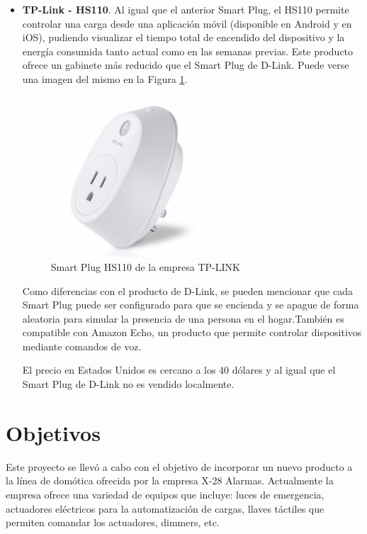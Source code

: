 \begin{itemize}
\item \textbf{TP-Link - HS110}. Al igual que el anterior Smart Plug, el HS110 permite controlar una carga desde una aplicación móvil (disponible en Android y en iOS), pudiendo visualizar el tiempo total de encendido del dispositivo y la energía consumida tanto actual como en las semanas previas. Este producto ofrece un gabinete más reducido que el Smart Plug de D-Link. Puede verse una imagen del mismo en la Figura \ref{fig:smartplug_tplink}.

\begin{figure}[h]
	\centering
	\includegraphics[width=6cm]{./Figures/1_2_TP-LINK-HS110.png}
	\caption{Smart Plug HS110 de la empresa TP-LINK}
	\label{fig:smartplug_tplink}
\end{figure}

Como diferencias con el producto de D-Link, se pueden mencionar que cada Smart Plug puede ser configurado para que se encienda y se apague de forma aleatoria para simular la presencia de una persona en el hogar.También es compatible con Amazon Echo, un producto que permite controlar dispositivos mediante comandos de voz.

El precio en Estados Unidos es cercano a los 40 dólares y al igual que el Smart Plug de D-Link no es vendido localmente.

\end{itemize}


\section{Objetivos}

Este proyecto se llevó a cabo con el objetivo de incorporar un nuevo producto a la línea de domótica ofrecida por la empresa X-28 Alarmas. Actualmente la empresa ofrece una variedad de equipos que incluye: luces de emergencia, actuadores eléctricos para la automatización de cargas, llaves táctiles que permiten comandar los actuadores, dimmers, etc.

